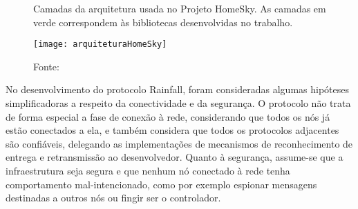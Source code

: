 \begin{figure}[H]
	\centering
	\caption{Camadas da arquitetura usada no Projeto HomeSky. As camadas em verde correspondem às bibliotecas desenvolvidas no trabalho.}
  \texttt{[image: arquiteturaHomeSky]}
	\caption*{Fonte: \cite{homeSky}}
\label{fig:arquiteturaHomeSky}
\end{figure}

No desenvolvimento do protocolo Rainfall, foram consideradas algumas hipóteses simplificadoras a respeito da conectividade e da segurança. O protocolo não trata de forma especial a fase de conexão à rede, considerando que todos os nós já estão conectados a ela, e também considera que todos os protocolos adjacentes são confiáveis, delegando as implementações de mecanismos de reconhecimento de entrega e retransmissão ao desenvolvedor. Quanto à segurança, assume-se que a infraestrutura seja segura e que nenhum nó conectado à rede tenha comportamento mal-intencionado, como por exemplo espionar mensagens destinadas a outros nós ou fingir ser o controlador.
